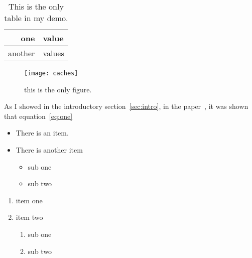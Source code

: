 \documentclass{artikel3}
\begin{document}
\begin{table}[ht]
  \centering
  \begin{tabular}{|rl|}
    \hline one&value \\ \hline another&values \\ \hline
  \end{tabular}
  \caption{This is the only table in my demo.}
  \label{tab:thetable}
\end{table}
\begin{figure}[ht]
  \centering
  \texttt{[image: caches]}
  \caption{this is the only figure.}
  \label{fig:thefigure}
\end{figure}
As I showed in the introductory section~\ref{sec:intro}, in the
paper~\cite{AdJo:colorblind}, it was shown that
equation~\eqref{eq:one}
\begin{itemize}
\item There is an item.
\item There is another item
  \begin{itemize}
  \item sub one
  \item sub two
  \end{itemize}
\end{itemize}
\begin{enumerate}
\item item one
\item item two
  \begin{enumerate}
  \item sub one
  \item sub two
  \end{enumerate}
\end{enumerate}

\tableofcontents
\listoffigures



\end{document}
